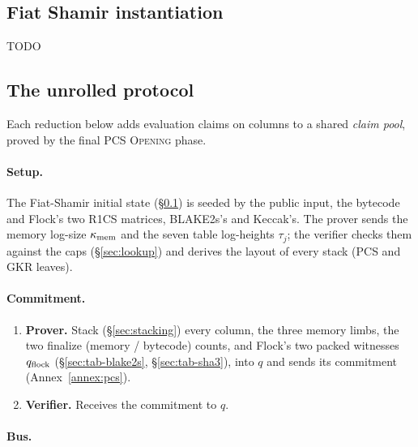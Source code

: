 \subsection{Fiat Shamir instantiation}\label{sec:e2e-fiat-shamir}

TODO

\subsection{The unrolled protocol}\label{sec:e2e-unrolled}

Each reduction below adds evaluation claims on columns to a shared \emph{claim pool}, proved by the final PCS \textsc{Opening} phase.

\paragraph{Setup.}


The Fiat-Shamir initial state (\S\ref{sec:e2e-fiat-shamir}) is seeded by the public input, the bytecode and Flock's two R1CS matrices, BLAKE2s's and Keccak's. The prover sends the memory log-size $\kappa_{\mathrm{mem}}$ and the seven table log-heights $\tau_j$; the verifier checks them against the caps (\S\ref{sec:lookup}) and derives the layout of every stack (PCS and GKR leaves).

\paragraph{Commitment.}

\begin{enumerate}
\item \textbf{Prover.} Stack (\S\ref{sec:stacking}) every column, the three memory limbs, the two finalize (memory / bytecode) counts, and Flock's two packed witnesses $q_{\mathrm{flock}}$ (\S\ref{sec:tab-blake2s}, \S\ref{sec:tab-sha3}), into $q$ and sends its commitment (Annex~\ref{annex:pcs}).
\item \textbf{Verifier.} Receives the commitment to $q$.
\end{enumerate}

\paragraph{Bus.}

